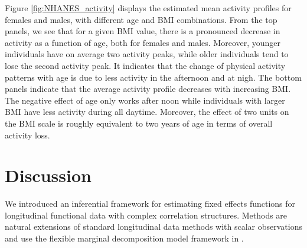 \documentclass[submit]{smj}
\begin{document}


Figure \ref{fig:NHANES_activity} displays the estimated mean activity profiles for females and males, with different age and BMI combinations. From the top panels, we see that for a given BMI value, there is a pronounced decrease in activity as a function of age, both for females and males. Moreover, younger individuals have on average two activity peaks, while older individuals tend to lose the second activity peak. It indicates that the change of physical activity patterns with age is due to less activity in the afternoon and at nigh. The bottom panels indicate that the average activity profile decreases with increasing BMI. The negative effect of age only works after noon while individuals with larger BMI have less activity during all daytime. Moreover, the effect of two units on the BMI scale is roughly equivalent to two years of age in terms of overall activity loss. 





\section{Discussion}\label{sec:conclusions}
We introduced an inferential framework for estimating  fixed effects functions for longitudinal functional data with complex correlation structures. Methods are natural extensions of standard longitudinal data methods with scalar observations and use the flexible marginal decomposition model framework in \cite{Park2015}. 
\end{document}
